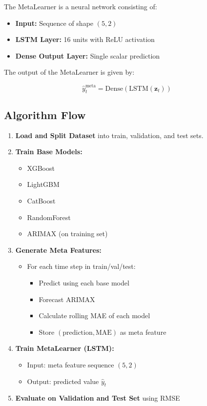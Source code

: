 The MetaLearner is a neural network consisting of:
\begin{itemize}
    \item \textbf{Input:} Sequence of shape $(5, 2)$
    \item \textbf{LSTM Layer:} 16 units with ReLU activation
    \item \textbf{Dense Output Layer:} Single scalar prediction
\end{itemize}

The output of the MetaLearner is given by:

\begin{equation}
\hat{y}_t^{\text{meta}} = \text{Dense} \left( \text{LSTM}(\mathbf{z}_t) \right)
\end{equation}

\subsection{Algorithm Flow}

\begin{enumerate}
    \item \textbf{Load and Split Dataset} into train, validation, and test sets.
    \item \textbf{Train Base Models:}
    \begin{itemize}
        \item XGBoost
        \item LightGBM
        \item CatBoost
        \item RandomForest
        \item ARIMAX (on training set)
    \end{itemize}
    \item \textbf{Generate Meta Features:}
    \begin{itemize}
        \item For each time step in train/val/test:
        \begin{itemize}
            \item Predict using each base model
            \item Forecast ARIMAX
            \item Calculate rolling MAE of each model
            \item Store $(\text{prediction}, \text{MAE})$ as meta feature
        \end{itemize}
    \end{itemize}
    \item \textbf{Train MetaLearner (LSTM):}
    \begin{itemize}
        \item Input: meta feature sequence $(5, 2)$
        \item Output: predicted value $\hat{y}_t$
    \end{itemize}
    \item \textbf{Evaluate on Validation and Test Set} using RMSE
\end{enumerate}

